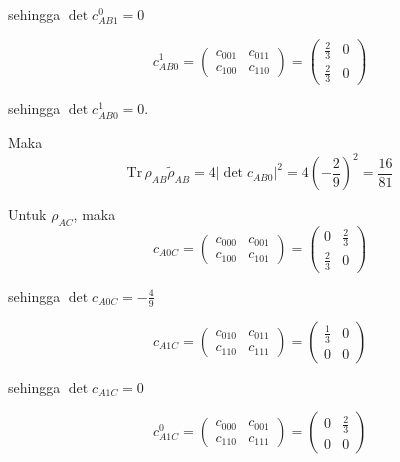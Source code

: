\begin{enumerate}
	sehingga $\det c_{AB1}^0 = 0$
	
	\begin{equation}
		c_{AB0}^1=
		\begin{pmatrix}
			c_{001} & c_{011} \\
			c_{100} & c_{110}
		\end{pmatrix}=
		\begin{pmatrix}
			\frac{2}{3} & 0 \\
			\frac{2}{3} & 0
		\end{pmatrix}
	\end{equation}
	
	sehingga $\det c_{AB0}^1 = 0$.
	
	Maka
	\begin{equation}
		\mathrm{Tr}\,\rho_{AB}\tilde{\rho}_{AB}=4|\det c_{AB0}|^2=4(-\frac{2}{9})^2=\frac{16}{81}
	\end{equation}
	
	Untuk $\rho_{AC}$, maka
	\begin{equation}
		c_{A0C}=
		\begin{pmatrix}
			c_{000} & c_{001} \\
			c_{100} & c_{101}
		\end{pmatrix}=
		\begin{pmatrix}
			0 & \frac{2}{3} \\
			\frac{2}{3} & 0
		\end{pmatrix}
	\end{equation}
	
	sehingga $\det c_{A0C} = -\frac{4}{9}$
	
	\begin{equation}
		c_{A1C}=
		\begin{pmatrix}
			c_{010} & c_{011} \\
			c_{110} & c_{111}
		\end{pmatrix}=
		\begin{pmatrix}
			\frac{1}{3} & 0 \\
			0 & 0
		\end{pmatrix}
	\end{equation}
	
	sehingga $\det c_{A1C} = 0$
	
	\begin{equation}
		c_{A1C}^0=
		\begin{pmatrix}
			c_{000} & c_{001} \\
			c_{110} & c_{111}
		\end{pmatrix}=
		\begin{pmatrix}
			0 & \frac{2}{3} \\
			0 & 0
		\end{pmatrix}
	\end{equation}
	

\end{enumerate}
